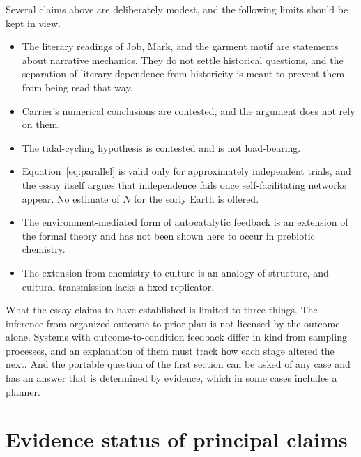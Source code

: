 \documentclass[11pt]{article}
\begin{document}
Several claims above are deliberately modest, and the following limits should be kept in view.
\begin{itemize}
\item The literary readings of Job, Mark, and the garment motif are statements about narrative mechanics. They do not settle historical questions, and the separation of literary dependence from historicity is meant to prevent them from being read that way.
\item Carrier's numerical conclusions are contested, and the argument does not rely on them.
\item The tidal-cycling hypothesis is contested and is not load-bearing.
\item Equation~\eqref{eq:parallel} is valid only for approximately independent trials, and the essay itself argues that independence fails once self-facilitating networks appear. No estimate of $N$ for the early Earth is offered.
\item The environment-mediated form of autocatalytic feedback is an extension of the formal theory and has not been shown here to occur in prebiotic chemistry.
\item The extension from chemistry to culture is an analogy of structure, and cultural transmission lacks a fixed replicator.
\end{itemize}

What the essay claims to have established is limited to three things. The inference from organized outcome to prior plan is not licensed by the outcome alone. Systems with outcome-to-condition feedback differ in kind from sampling processes, and an explanation of them must track how each stage altered the next. And the portable question of the first section can be asked of any case and has an answer that is determined by evidence, which in some cases includes a planner.

\appendix
\section{Evidence status of principal claims}
\end{document}
